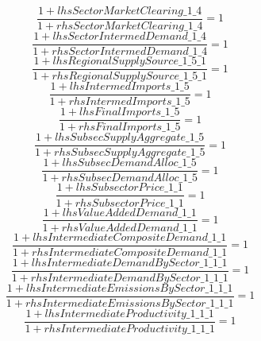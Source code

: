 \begin{dmath}
\frac{1+{lhsSectorMarketClearing\_1\_4}}{1+{rhsSectorMarketClearing\_1\_4}}=1
\end{dmath}
\begin{dmath}
\frac{1+{lhsSectorIntermedDemand\_1\_4}}{1+{rhsSectorIntermedDemand\_1\_4}}=1
\end{dmath}
\begin{dmath}
\frac{1+{lhsRegionalSupplySource\_1\_5\_1}}{1+{rhsRegionalSupplySource\_1\_5\_1}}=1
\end{dmath}
\begin{dmath}
\frac{1+{lhsIntermedImports\_1\_5}}{1+{rhsIntermedImports\_1\_5}}=1
\end{dmath}
\begin{dmath}
\frac{1+{lhsFinalImports\_1\_5}}{1+{rhsFinalImports\_1\_5}}=1
\end{dmath}
\begin{dmath}
\frac{1+{lhsSubsecSupplyAggregate\_1\_5}}{1+{rhsSubsecSupplyAggregate\_1\_5}}=1
\end{dmath}
\begin{dmath}
\frac{1+{lhsSubsecDemandAlloc\_1\_5}}{1+{rhsSubsecDemandAlloc\_1\_5}}=1
\end{dmath}
\begin{dmath}
\frac{1+{lhsSubsectorPrice\_1\_1}}{1+{rhsSubsectorPrice\_1\_1}}=1
\end{dmath}
\begin{dmath}
\frac{1+{lhsValueAddedDemand\_1\_1}}{1+{rhsValueAddedDemand\_1\_1}}=1
\end{dmath}
\begin{dmath}
\frac{1+{lhsIntermediateCompositeDemand\_1\_1}}{1+{rhsIntermediateCompositeDemand\_1\_1}}=1
\end{dmath}
\begin{dmath}
\frac{1+{lhsIntermediateDemandBySector\_1\_1\_1}}{1+{rhsIntermediateDemandBySector\_1\_1\_1}}=1
\end{dmath}
\begin{dmath}
\frac{1+{lhsIntermediateEmissionsBySector\_1\_1\_1}}{1+{rhsIntermediateEmissionsBySector\_1\_1\_1}}=1
\end{dmath}
\begin{dmath}
\frac{1+{lhsIntermediateProductivity\_1\_1\_1}}{1+{rhsIntermediateProductivity\_1\_1\_1}}=1
\end{dmath}
